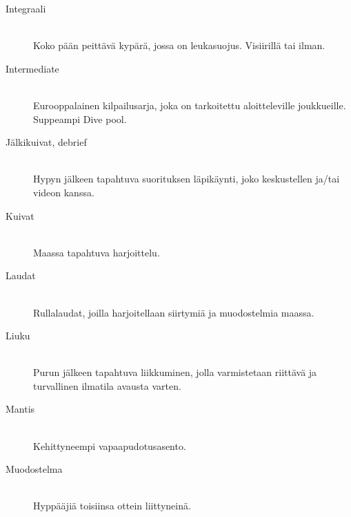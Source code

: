 \begin{description}
\item[Integraali ] \hfill \\ 
Koko pään peittävä kypärä, jossa on leukasuojus. Visiirillä tai ilman. \hfill \\ 
\end{description}
\begin{description}
\item[Intermediate ] \hfill \\ 
Eurooppalainen kilpailusarja, joka on tarkoitettu aloitteleville joukkueille. Suppeampi Dive pool. \hfill \\ 
\end{description}
\begin{description}
\item[Jälkikuivat, debrief   ] \hfill \\ 
Hypyn jälkeen tapahtuva suorituksen läpikäynti, joko keskustellen ja/tai videon kanssa. \hfill \\ 
\end{description}
\begin{description}
\item[Kuivat ] \hfill \\ 
Maassa tapahtuva harjoittelu. \hfill \\ 
\end{description}
\begin{description}
\item[Laudat ] \hfill \\ 
Rullalaudat, joilla harjoitellaan siirtymiä ja muodostelmia maassa. \hfill \\ 
\end{description}
\begin{description}
\item[Liuku ] \hfill \\ 
Purun jälkeen tapahtuva liikkuminen, jolla varmistetaan riittävä ja turvallinen ilmatila avausta varten. \hfill \\ 
\end{description}
\begin{description}
\item[Mantis ] \hfill \\ 
Kehittyneempi vapaapudotusasento. \hfill \\ 
\end{description}
\begin{description}
\item[Muodostelma ] \hfill \\ 
Hyppääjiä toisiinsa ottein liittyneinä. \hfill \\ 
\end{description}
